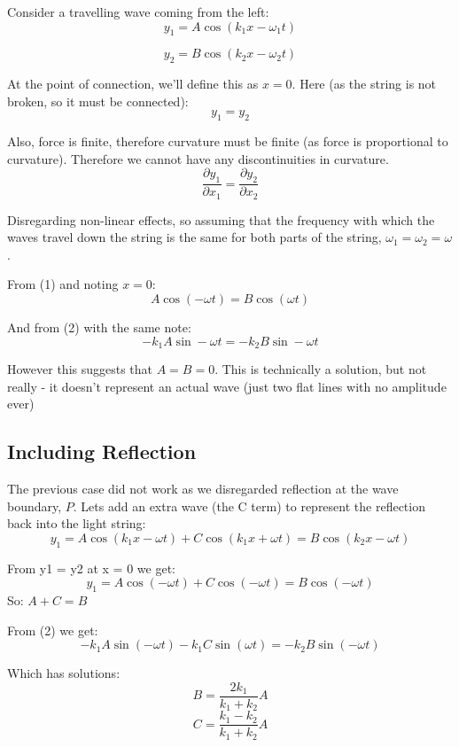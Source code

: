 Consider a travelling wave coming from the left:
\[
    y_1 = A \cos(k_1 x - \omega_1 t)
\]

\[
    y_2 = B \cos(k_2 x - \omega_2 t)
\]

At the point of connection, we'll define this as $x = 0$. Here (as the string is not broken, so it must be connected):
\begin{equation}
    y_1 = y_2
\end{equation}

Also, force is finite, therefore curvature must be finite (as force is proportional to curvature). Therefore we cannot have any discontinuities in curvature.
\begin{equation}
    \frac{\partial y_1}{\partial x_1} = \frac{\partial y_2}{\partial x_2}
\end{equation}

Disregarding non-linear effects, so assuming that the frequency with which the waves travel down the string is the same for both parts of the string, $\omega_1 = \omega_2 = \omega$.

From (1) and noting $x = 0$:
\begin{equation}
    A \cos(-\omega t) = B \cos(\omega t)
\end{equation}

And from (2) with the same note:
\begin{equation}
    -k_1 A \sin -\omega t = -k_2 B \sin -\omega t
\end{equation}

However this suggests that $A = B = 0$. This is technically a solution, but not really - it doesn't represent an actual wave (just two flat lines with no amplitude ever)

\subsection*{Including Reflection}
The previous case did not work as we disregarded reflection at the wave boundary, $P$. Lets add an extra wave (the C term) to represent the reflection back into the light string:
\[
    y_1 = A \cos(k_1 x - \omega t) + C \cos(k_1 x + \omega t) = B \cos(k_2 x - \omega t)
\]

From y1 = y2 at x = 0 we get:
\[
        y_1 = A \cos(- \omega t) + C \cos( -\omega t) = B \cos( - \omega t)
\]
So: $A+C = B$
 
From (2) we get:
\[
    -k_1 A \sin(- \omega t) - k_1 C \sin(\omega t) = -k_2 B \sin(-\omega t)
\]

Which has solutions:
\[
    B = \frac{2k_1}{k_1 + k_2} A
\]
\[
    C = \frac{k_1 - k_2}{k_1 + k_2}A
\]

